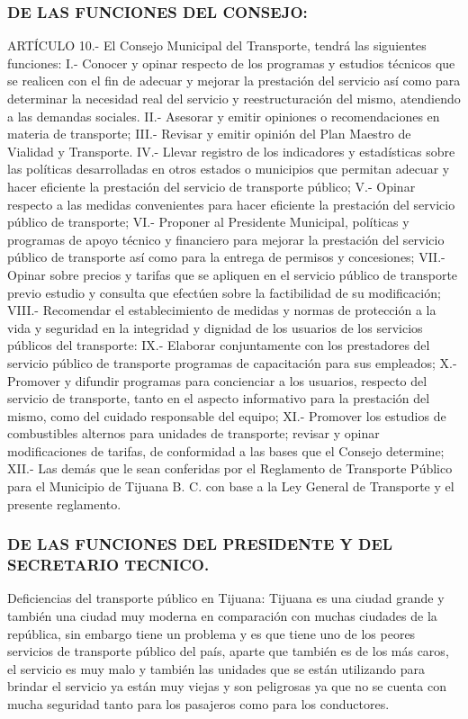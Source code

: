 \documentclass{bmcart}
\begin{document}
\subsubsection{DE LAS FUNCIONES DEL CONSEJO:}
ARTÍCULO 10.- El Consejo Municipal del Transporte, tendrá las siguientes funciones:
I.- Conocer y opinar respecto de los programas y estudios técnicos que se realicen con el fin de adecuar y mejorar la prestación del servicio así como para determinar la necesidad real del servicio y reestructuración del mismo, atendiendo a las demandas sociales.
II.- Asesorar y emitir opiniones o recomendaciones en materia de transporte; III.- Revisar y emitir opinión del Plan Maestro de Vialidad y Transporte.
IV.- Llevar registro de los indicadores y estadísticas sobre las políticas desarrolladas en otros estados o municipios que permitan adecuar y hacer eficiente la prestación del servicio de transporte público;
V.- Opinar respecto a las medidas convenientes para hacer eficiente la prestación del servicio público de transporte;
VI.- Proponer al Presidente Municipal, políticas y programas de apoyo técnico y financiero para mejorar la prestación del servicio público de transporte así como para la entrega de permisos y concesiones;
VII.- Opinar sobre precios y tarifas que se apliquen en el servicio público de transporte previo estudio y consulta que efectúen sobre la factibilidad de su modificación;
VIII.- Recomendar el establecimiento de medidas y normas de protección a la vida y seguridad en la integridad y dignidad de los usuarios de los servicios públicos del transporte:
IX.- Elaborar conjuntamente con los prestadores del servicio público de transporte programas de capacitación para sus empleados;
X.- Promover y difundir programas para concienciar a los usuarios, respecto del servicio de transporte, tanto en el aspecto informativo para la prestación del mismo, como del cuidado responsable del equipo;
XI.- Promover los estudios de combustibles alternos para unidades de transporte; revisar y opinar modificaciones de tarifas, de conformidad a las bases que el Consejo determine;
XII.- Las demás que le sean conferidas por el Reglamento de Transporte Público para el Municipio de Tijuana B. C. con base a la Ley General de Transporte y el presente reglamento.


\subsubsection{DE LAS FUNCIONES DEL PRESIDENTE Y DEL SECRETARIO TECNICO.}
Deficiencias del transporte público en Tijuana:
Tijuana es una ciudad grande y también una ciudad muy moderna en comparación con muchas ciudades de la república, sin embargo tiene un problema y es que tiene uno de los peores servicios de transporte público del país, aparte que también es de los más caros, el servicio es muy malo y también las unidades que se están utilizando para brindar el servicio ya están muy viejas y son peligrosas ya que no se cuenta con mucha seguridad tanto para los pasajeros como para los conductores.
\end{document}
